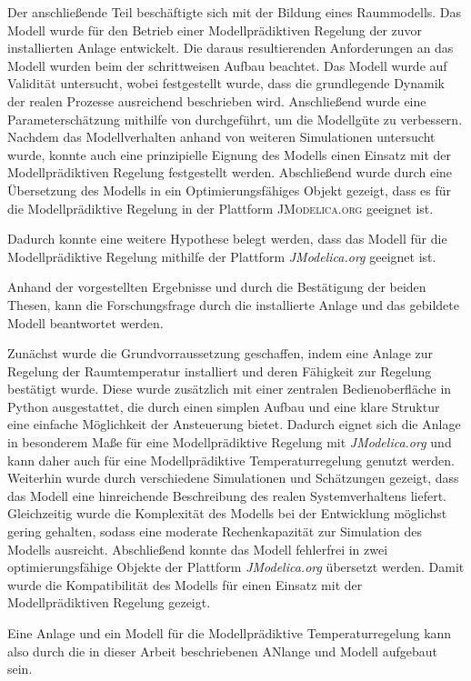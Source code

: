 Der anschließende Teil beschäftigte sich mit der Bildung eines Raummodells. Das Modell wurde für den Betrieb einer Modellprädiktiven Regelung der zuvor installierten Anlage entwickelt. Die daraus resultierenden Anforderungen an das Modell wurden beim der schrittweisen Aufbau beachtet. Das Modell wurde auf Validität untersucht, wobei festgestellt wurde, dass die grundlegende Dynamik der realen Prozesse ausreichend beschrieben wird. Anschließend wurde eine Parameterschätzung mithilfe von \cite{casiopeia} durchgeführt, um die Modellgüte zu verbessern. Nachdem das Modellverhalten anhand von weiteren Simulationen untersucht wurde, konnte auch eine prinzipielle Eignung des Modells einen Einsatz mit der Modellprädiktiven Regelung festgestellt werden. Abschließend wurde durch eine Übersetzung des Modells in ein Optimierungsfähiges Objekt gezeigt, dass es für die Modellprädiktive Regelung in der Plattform \textsc{JModelica.org} geeignet ist.


Dadurch konnte eine weitere Hypothese belegt werden, dass das Modell für die Modellprädiktive Regelung mithilfe der Plattform \textit{JModelica.org} geeignet ist.

Anhand der vorgestellten Ergebnisse und durch die Bestätigung der beiden Thesen, kann die Forschungsfrage durch die installierte Anlage und das gebildete Modell beantwortet werden.

Zunächst wurde die Grundvorraussetzung geschaffen, indem eine Anlage zur Regelung der Raumtemperatur installiert und deren Fähigkeit zur Regelung bestätigt wurde. Diese wurde zusätzlich mit einer zentralen Bedienoberfläche in Python ausgestattet, die durch einen simplen Aufbau und eine klare Struktur eine einfache Möglichkeit der Ansteuerung bietet. Dadurch eignet sich die Anlage in besonderem Maße für eine Modellprädiktive Regelung mit \textit{JModelica.org} und kann daher auch für eine Modellprädiktive Temperaturregelung genutzt werden. 
Weiterhin wurde durch verschiedene Simulationen und Schätzungen gezeigt, dass das Modell eine hinreichende Beschreibung des realen Systemverhaltens liefert. Gleichzeitig wurde die Komplexität des Modells bei der Entwicklung möglichst gering gehalten, sodass eine moderate Rechenkapazität zur Simulation des Modells ausreicht. Abschließend konnte das Modell fehlerfrei in zwei optimierungsfähige Objekte der Plattform \textit{JModelica.org} übersetzt werden. Damit wurde die Kompatibilität des Modells für einen Einsatz mit der Modellprädiktiven Regelung gezeigt.

Eine Anlage und ein Modell für die Modellprädiktive Temperaturregelung kann also durch die in dieser Arbeit beschriebenen ANlange und Modell aufgebaut sein.

